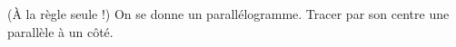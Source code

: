 (À la règle seule !) On se donne un parallélogramme. Tracer par son centre une parallèle à un côté.
